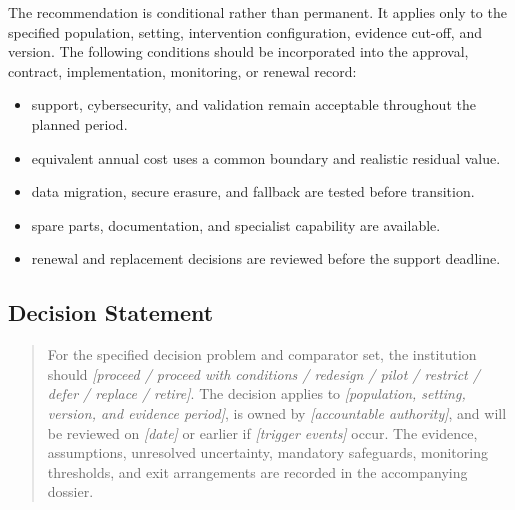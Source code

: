 The recommendation is conditional rather than permanent. It applies only to the
specified population, setting, intervention configuration, evidence cut-off, and
version. The following conditions should be incorporated into the approval,
contract, implementation, monitoring, or renewal record:

\begin{itemize}
 \item support, cybersecurity, and validation remain acceptable throughout the planned period.
 \item equivalent annual cost uses a common boundary and realistic residual value.
 \item data migration, secure erasure, and fallback are tested before transition.
 \item spare parts, documentation, and specialist capability are available.
 \item renewal and replacement decisions are reviewed before the support deadline.
\end{itemize}

\subsection{Decision Statement}
\begin{quote}
For the specified decision problem and comparator set, the institution should
\emph{[proceed / proceed with conditions / redesign / pilot / restrict / defer /
replace / retire]}. The decision applies to \emph{[population, setting, version,
and evidence period]}, is owned by \emph{[accountable authority]}, and will be
reviewed on \emph{[date]} or earlier if \emph{[trigger events]} occur. The
evidence, assumptions, unresolved uncertainty, mandatory safeguards, monitoring
thresholds, and exit arrangements are recorded in the accompanying dossier.
\end{quote}
